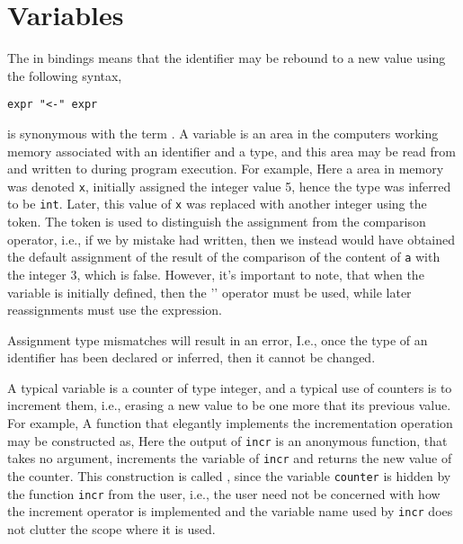 \section{Variables}
\label{sec:mutableValues}
The  in  bindings means that the identifier may be rebound to a new value using the following syntax,\idxs{\lstinline{<-}}
%
\begin{lstlisting}[language=ebnf]
expr "<-" expr
\end{lstlisting}
 is synonymous with the term . A variable is an area in the computers working memory associated with an identifier and a type, and this area may be read from and written to during program execution. For example,
%
%
Here a area in memory was denoted \texttt{x}, initially assigned the integer value 5, hence the type was inferred to be \lstinline|int|.  Later, this value of \texttt{x} was replaced with another integer using the \idx{\token{<-}} token. The \token{<-} token is used to distinguish the assignment from the comparison operator, i.e., if we by mistake had written,
%
%
%
then we instead would have obtained the default assignment of the result of the comparison of the content of \lstinline|a| with the integer 3, which is false. However, it's important to note, that when the variable is initially defined, then the '\token{=}' operator must be used, while later reassignments must use the \token{<-} expression.

Assignment type mismatches will result in an error, 
%
%
I.e., once the type of an identifier has been declared or inferred, then it cannot be changed.

A typical variable is a counter of type integer, and a typical use of counters is to increment them, i.e., erasing a new value to be one more that its previous value. For example,
%
%
A function that elegantly implements the incrementation operation may be constructed as,
%
%
 Here the output of \texttt{incr} is an anonymous function, that takes no argument, increments the variable of \texttt{incr} and returns the new value of the counter. This construction is called , since the variable \texttt{counter} is hidden by the function \texttt{incr} from the user, i.e., the user need not be concerned with how the increment operator is implemented and the variable name used by \texttt{incr} does not clutter the scope where it is used.



